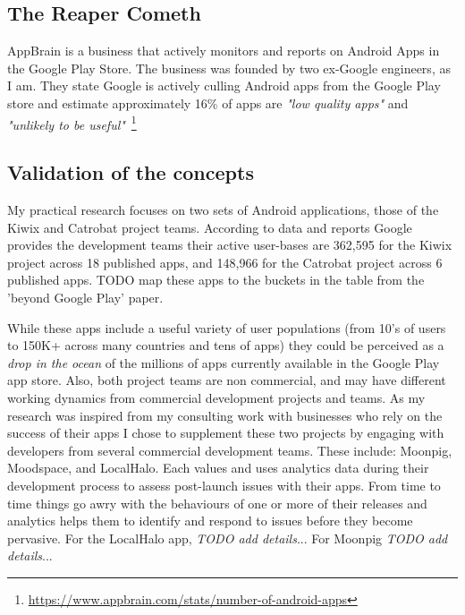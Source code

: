\subsection{The Reaper Cometh}
AppBrain is a business that actively monitors and reports on Android Apps in the Google Play Store. The business was founded by two ex-Google engineers, as I am. They state Google is actively culling Android apps from the Google Play store and estimate approximately 16\% of apps are \emph{"low quality apps"} and \emph{"unlikely to be useful"}~\footnote{\url{https://www.appbrain.com/stats/number-of-android-apps}} %


\subsection{Validation of the concepts}
My practical research focuses on two sets of Android applications, those of the Kiwix and Catrobat project teams. According to data and reports Google provides the development teams their active user-bases are 362,595 for the Kiwix project across 18 published apps, and 148,966 for the Catrobat project across 6 published apps. %
TODO map these apps to the buckets in the table from the 'beyond Google Play' paper.

While these apps include a useful variety of user populations (from 10's of users to 150K+ across many countries and tens of apps) they could be perceived as a \emph{drop in the ocean} of the millions of apps currently available in the Google Play app store. Also, both project teams are non commercial, and may have different working dynamics from commercial development projects and teams. As my research was inspired from my consulting work with businesses who rely on the success of their apps I chose to supplement these two projects by engaging with developers from several commercial development teams. These include: Moonpig, Moodspace, and LocalHalo. Each values and uses analytics data during their development process to assess post-launch issues with their apps. From time to time things go awry with the behaviours of one or more of their releases and analytics helps them to identify and respond to issues before they become pervasive. For the LocalHalo app, \emph{TODO add details}... For Moonpig \emph{TODO add details}...


